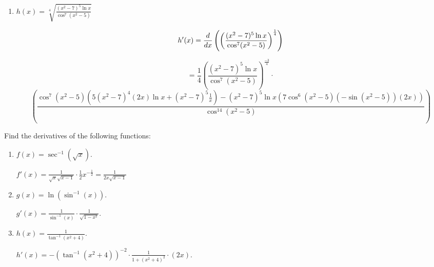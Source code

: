 \documentclass[nooutcomes]{ximera}
\begin{document}
\begin{problem}
\begin{enumerate}
		
		
	\item  $h(x) = \sqrt[4]{\frac{(x^2 - 7)^5 \ln x}{\cos^7(x^2 - 5)}}$
		\begin{freeResponse}
		$$h'(x) = \frac{d}{dx} \left( \left( \frac{(x^2 - 7)^5 \ln x}{\cos^7(x^2 - 5)} \right)^{\frac{1}{4}} \right) $$
		
		$$=  \frac{1}{4} \left( \frac{(x^2 - 7)^5 \ln x}{\cos^7(x^2 - 5)} \right)^{\frac{-3}{4}} \cdot $$
		$$\left( \frac{\cos^7(x^2 - 5)(5(x^2-7)^4(2x) \ln x + (x^2-7)^5 \frac{1}{x}) - (x^2-7)^5 \ln x (7\cos^6(x^2-5) (-\sin(x^2 - 5))(2x))}{\cos^{14}(x^2 - 5)} \right)$$
		\end{freeResponse}
		
		
		
	\end{enumerate}
		
		
\end{problem}
















\begin{problem}
Find the derivatives of the following functions:
	\begin{enumerate}
	
	\item  $f(x) = \sec^{-1} (\sqrt{x})$.
		\begin{freeResponse}
		$f'(x) = \frac{1}{\sqrt{x} \sqrt{x - 1}} \cdot \frac{1}{2} x^{-\frac{1}{2}} = \frac{1}{2x\sqrt{x-1}}$
		\end{freeResponse}
		
		
		
	\item  $g(x) = \ln (\sin^{-1}(x))$.
		\begin{freeResponse}
		$g'(x) = \frac{1}{\sin^{-1}(x)} \cdot \frac{1}{\sqrt{1-x^2}}$.
		\end{freeResponse}
		
		
		
	\item  $h(x) = \frac{1}{\tan^{-1}(x^2 + 4)}$.  
		\begin{freeResponse}
		$h'(x) = - \left( \tan^{-1}(x^2 + 4) \right)^{-2} \cdot \frac{1}{1 + (x^2 + 4)^2} \cdot (2x)$.
		\end{freeResponse}
		
		
		
	\end{enumerate}
		
		
\end{problem}
\end{document}
